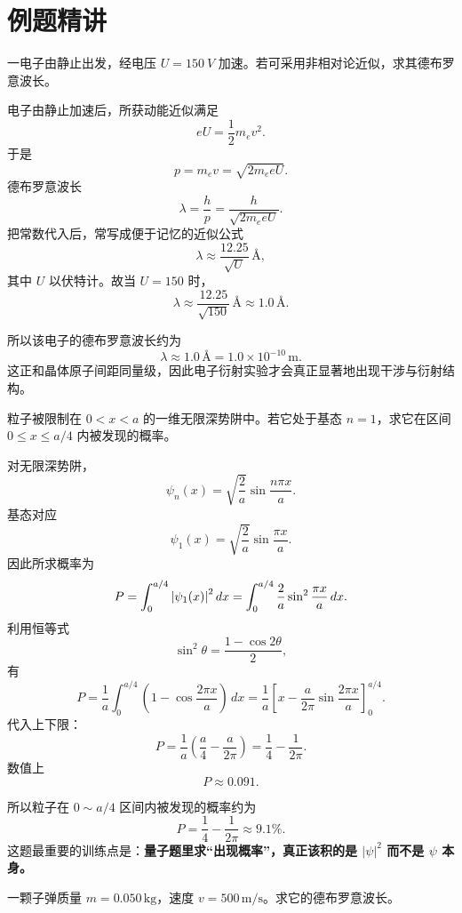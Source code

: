 \documentclass[lang=cn,11pt]{elegantbook}
\begin{document}
\section{例题精讲}

\begin{example}[电子经电压加速后的德布罗意波长]
一电子由静止出发，经电压 \(U=\SI{150}{V}\) 加速。若可采用非相对论近似，求其德布罗意波长。
\end{example}

\begin{solution}
电子由静止加速后，所获动能近似满足
\[
eU=\frac12 m_ev^2.
\]
于是
\[
p=m_ev=\sqrt{2m_eeU}.
\]
德布罗意波长
\[
\lambda=\frac{h}{p}
=\frac{h}{\sqrt{2m_eeU}}.
\]
把常数代入后，常写成便于记忆的近似公式
\[
\lambda\approx \frac{12.25}{\sqrt{U}}\,\text{\AA},
\]
其中 \(U\) 以伏特计。故当 \(U=150\) 时，
\[
\lambda\approx \frac{12.25}{\sqrt{150}}\,\text{\AA}\approx 1.0\,\text{\AA}.
\]

所以该电子的德布罗意波长约为
\[
\boxed{\lambda\approx 1.0\,\text{\AA}=1.0\times 10^{-10}\,\mathrm{m}.}
\]
这正和晶体原子间距同量级，因此电子衍射实验才会真正显著地出现干涉与衍射结构。
\end{solution}

\begin{example}
粒子被限制在 \(0<x<a\) 的一维无限深势阱中。若它处于基态 \(n=1\)，求它在区间 \(0\le x\le a/4\) 内被发现的概率。
\end{example}

\begin{solution}
对无限深势阱，
\[
\psi_n(x)=\sqrt{\frac{2}{a}}\sin\frac{n\pi x}{a}.
\]
基态对应
\[
\psi_1(x)=\sqrt{\frac{2}{a}}\sin\frac{\pi x}{a}.
\]
因此所求概率为
\[
P=\int_0^{a/4}\abs{\psi_1(x)}^2\,dx
=\int_0^{a/4}\frac{2}{a}\sin^2\frac{\pi x}{a}\,dx.
\]
利用恒等式
\[
\sin^2\theta=\frac{1-\cos2\theta}{2},
\]
有
\[
P=\frac{1}{a}\int_0^{a/4}\left(1-\cos\frac{2\pi x}{a}\right)\,dx
=\frac{1}{a}\left[x-\frac{a}{2\pi}\sin\frac{2\pi x}{a}\right]_0^{a/4}.
\]
代入上下限：
\[
P=\frac{1}{a}\left(\frac{a}{4}-\frac{a}{2\pi}\right)
=\frac14-\frac{1}{2\pi}.
\]
数值上
\[
P\approx 0.091.
\]

所以粒子在 \(0\sim a/4\) 区间内被发现的概率约为
\[
\boxed{P=\frac14-\frac{1}{2\pi}\approx 9.1\%.}
\]
这题最重要的训练点是：\textbf{量子题里求“出现概率”，真正该积的是 \(|\psi|^2\) 而不是 \(\psi\) 本身。}
\end{solution}

\begin{example}[子弹的德布罗意波长有多短]
一颗子弹质量 \(m=0.050\,\mathrm{kg}\)，速度 \(v=500\,\mathrm{m/s}\)。求它的德布罗意波长。
\end{example}
\end{document}
